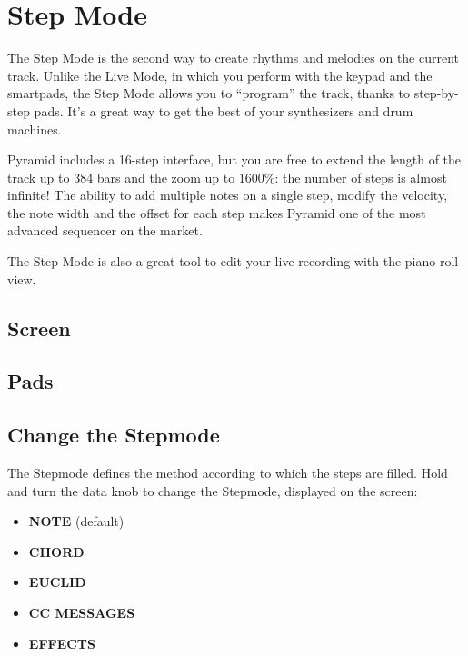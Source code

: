 \chapter{Step Mode}

The Step Mode is the second way to create rhythms and melodies on the current track. Unlike the Live Mode, in which you perform with the keypad and the smartpads, the Step Mode allows you to ``program'' the track, thanks to step-by-step pads. It's a great way to get the best of your synthesizers and drum machines.

Pyramid includes a 16-step interface, but you are free to extend the length of the track up to 384 bars and the zoom up to 1600\%: the number of steps is almost infinite! The ability to add multiple notes on a single step, modify the velocity, the note width and the offset for each step makes Pyramid one of the most advanced sequencer on the market.

The Step Mode is also a great tool to edit your live recording with the piano roll view.


\section{Screen}



\section{Pads}



\section{Change the Stepmode}

The Stepmode defines the method according to which the steps are filled. Hold  and turn the data knob \encodericon{} to change the Stepmode, displayed on the screen:

\begin{itemize}
\item \textbf{NOTE} (default)
\item \textbf{CHORD}
\item \textbf{EUCLID}
\item \textbf{CC MESSAGES}
\item \textbf{EFFECTS}
\end{itemize}


